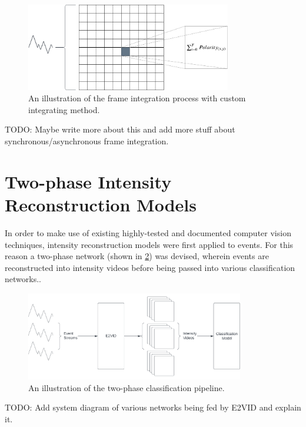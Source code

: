 \begin{figure}[htb]
    \centering
    \includegraphics[width=0.8\textwidth]{analysisanddesign/images/frame_integration_illustration.png}
    \caption{An illustration of the frame integration process with custom integrating method.}
    \label{fig:frame_integration_diagram}
\end{figure}

\color{red} TODO: Maybe write more about this and add more stuff about synchronous/asynchronous frame integration. \color{black}

\section{Two-phase Intensity Reconstruction Models}

In order to make use of existing highly-tested and documented computer vision techniques, intensity reconstruction models were first applied to events. For this reason a two-phase network (shown in \cref{fig:two_phase_network_pipeline}) was devised, wherein events are reconstructed into intensity videos before being passed into various classification networks..


\begin{figure}[htb]
    \centering
    \includegraphics[width=0.85\textwidth]{analysisanddesign/images/two_phase_network_pipeline.png}
    \caption{An illustration of the two-phase classification pipeline.}
    \label{fig:two_phase_network_pipeline}
\end{figure}

\color{red} TODO: Add system diagram of various networks being fed by E2VID and explain it. \color{black}

